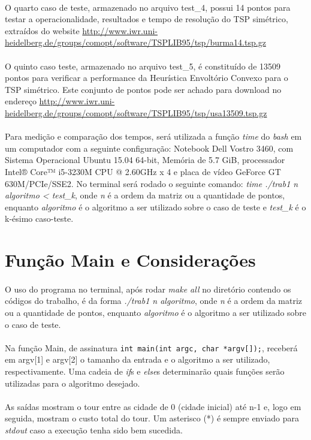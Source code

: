 \documentclass[12pt,a4paper]{article}
\begin{document}
  {\paragraph{} O quarto caso de teste, armazenado no arquivo test\_4, possui 14 pontos para testar a operacionalidade, resultados e tempo de resolução do TSP simétrico, extraídos do website \url{http://www.iwr.uni-heidelberg.de/groups/comopt/software/TSPLIB95/tsp/burma14.tsp.gz} }
  {\paragraph{} O quinto caso teste, armazenado no arquivo test\_5, é constituído de 13509 pontos para verificar a performance da Heurística Envoltório Convexo para o TSP simétrico. Este conjunto de pontos pode ser achado para download no endereço \url{http://www.iwr.uni-heidelberg.de/groups/comopt/software/TSPLIB95/tsp/usa13509.tsp.gz} }
  {\paragraph{} Para medição e comparação dos tempos, será utilizada a função \emph{time} do {\it bash} em um computador com a seguinte configuração: Notebook Dell Vostro 3460, com Sistema Operacional Ubuntu 15.04 64-bit, Memória de 5.7 GiB, processador Intel® Core™ i5-3230M CPU @ 2.60GHz x 4 e placa de vídeo GeForce GT 630M/PCIe/SSE2. No terminal será rodado o seguinte comando: \emph{time ./trab1 n algoritmo < test\_k}, onde \emph{n} é a ordem da matriz ou a quantidade de pontos, enquanto \emph{algoritmo} é o algoritmo a ser utilizado sobre o caso de teste e \emph{test\_k} é o k-ésimo caso-teste.}
  
 \newpage
 \section{Função Main e Considerações}	
  {\paragraph{} O uso do programa no terminal, após rodar \emph{make all} no diretório contendo os códigos do trabalho, é da forma \emph{./trab1 n algoritmo}, onde \emph{n} é a ordem da matriz ou a quantidade de pontos, enquanto \emph{algoritmo} é o algoritmo a ser utilizado sobre o caso de teste. }
  {\paragraph{} Na função Main, de assinatura {\tt int main(int argc, char *argv[]);}, receberá em argv[1] e argv[2] o tamanho da entrada e o algoritmo a ser utilizado, respectivamente. Uma cadeia de {\it if}s e {\it else}s determinarão quais funções serão utilizadas para o algoritmo desejado.}
  {\paragraph{} As saídas mostram o tour entre as cidade de 0 (cidade inicial) até n-1 e, logo em seguida, mostram o custo total do tour. Um asterisco (*) é sempre enviado para {\it stdout} caso a execução tenha sido bem sucedida. }
  
\end{document}
